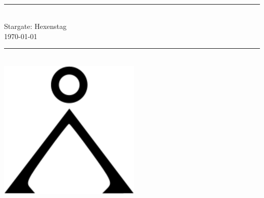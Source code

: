 \documentclass[12pt,twoside,onecolumn,openany,final]{memoir}
\begin{document}

\thispagestyle{empty}
\begin{center}
\textsc{\Large}\\[0.25cm]
\rule{\linewidth}{0.5mm} \\[0.6cm]
\fontsize{30}{30} \selectfont Stargate: Hexenstag\\[.30cm]
\fontsize{16}{18} \selectfont \normalsize{\today}\\
\rule{\linewidth}{0.5mm} \\[0.6cm]
\includegraphics[scale=2]{cover-image.png} %
\vfill
\end{center}

\pagebreak

\sffamily
\pagestyle{plain}
\raggedbottom

\renewcommand{\contentsname}{Table of Contents}
\setcounter{tocdepth}{2}
\small{\tableofcontents}


\clearpage


\pagebreak
\pagebreak

\appendix
\appendixpage
\end{document}
